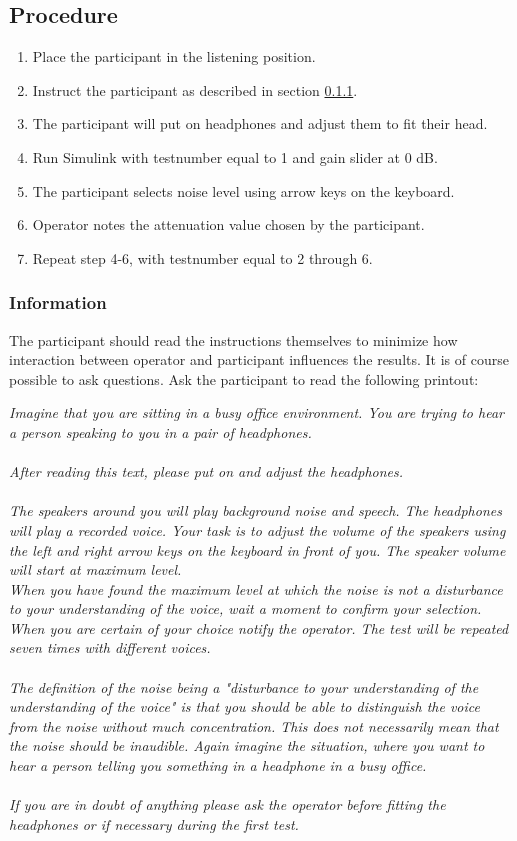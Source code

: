 \subsection{Procedure}

\begin{enumerate}
	\item Place the participant in the listening position.
	\item Instruct the participant as described in section \ref{subsubsec:attenuationInformation}.
	\item The participant will put on headphones and adjust them to fit their head.
	\item Run Simulink  with testnumber equal to 1 and gain slider at 0 dB.
	\item The participant selects noise level using arrow keys on the keyboard.
	\item Operator notes the attenuation value chosen by the participant.
	\item Repeat step 4-6, with testnumber equal to 2 through 6.
\end{enumerate}

\subsubsection{Information}\label{subsubsec:attenuationInformation}
The participant should read the instructions themselves to minimize how interaction between operator and participant influences the results. It is of course possible to ask questions.   
Ask the participant to read the following printout:

\textit{Imagine that you are sitting in a busy office environment. You are trying to hear a person speaking to you in a pair of headphones. \\\\
After reading this text, please put on and adjust the headphones.\\\\
The speakers around you will play background noise and speech. The headphones will play a recorded voice. Your task is to adjust the volume of the speakers using the left and right arrow keys on the keyboard in front of you. The speaker volume will start at maximum level. \\
When you have found the maximum level at which the noise is not a disturbance to your understanding of the voice, wait a moment to confirm your selection. When you are certain of your choice notify the operator. 
The test will be repeated seven times with different voices. \\\\
The definition of the noise being a "disturbance to your understanding of the understanding of the voice" is that you should be able to distinguish the voice from the noise without much concentration. This does not necessarily mean that the noise should be inaudible. Again imagine the situation, where you want to hear a person telling you something in a headphone in a busy office.\\\\ 
If you are in doubt of anything please ask the operator before fitting the headphones or if necessary during the first test.}

